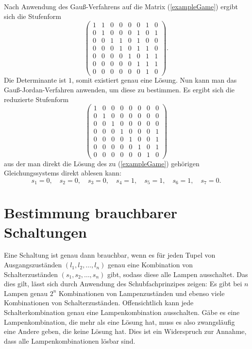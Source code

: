 \documentclass{scrartcl}
\begin{document}
Nach Anwendung des Gauß-Verfahrens auf die Matrix (\ref{exampleGame}) ergibt
sich die Stufenform
\begin{equation}
\left(\begin{array}{ccccccc|c}
  1&1&0&0&0&0&1&0\\
  0&1&0&0&0&1&0&1\\
  0&0&1&1&0&1&0&0\\
  0&0&0&1&0&1&1&0\\
  0&0&0&0&1&0&1&1\\
  0&0&0&0&0&1&1&1\\
  0&0&0&0&0&0&1&0
\end{array}\right).
\end{equation}
Die Determinante ist $1$, somit existiert genau eine Lösung. Nun kann man das
Gauß-Jordan-Verfahren anwenden, um diese zu bestimmen. Es ergibt sich die
reduzierte Stufenform
\begin{equation}
\left(\begin{array}{ccccccc|c}
  1&0&0&0&0&0&0&0\\
  0&1&0&0&0&0&0&0\\
  0&0&1&0&0&0&0&0\\
  0&0&0&1&0&0&0&1\\
  0&0&0&0&1&0&0&1\\
  0&0&0&0&0&1&0&1\\
  0&0&0&0&0&0&1&0
\end{array}\right)
\end{equation}
aus der man direkt die Lösung des zu (\ref{exampleGame}) gehörigen
Gleichungssystems direkt ablesen kann:
\begin{equation}
s_1 = 0,\quad
s_2 = 0,\quad
s_3 = 0,\quad
s_4 = 1,\quad
s_5 = 1,\quad
s_6 = 1,\quad
s_7 = 0.
\end{equation}

\section{Bestimmung brauchbarer Schaltungen}
Eine Schaltung ist genau dann brauchbar, wenn es für jeden Tupel von
Ausgangszuständen $(l_1,l_2,\dots,l_n)$ genau eine Kombination von
Schalterzuständen $(s_1,s_2,\dots,s_n)$ gibt, sodass diese alle Lampen
ausschaltet. Das dies gilt, lässt sich durch Anwendung des Schubfachprinzipes
zeigen: Es gibt bei $n$ Lampen genau $2^n$ Kombinationen von Lampenzuständen und
ebenso viele Kombinationen von Schalterzuständen. Offensichtlich kann jede
Schalterkombination genau eine Lampenkombination ausschalten. Gäbe es eine
Lampenkombination, die mehr als eine Lösung hat, muss es also zwangsläufig eine
Andere geben, die keine Lösung hat. Dies ist ein Widerspruch zur Annahme, dass
alle Lampenkombinationen lösbar sind.
\end{document}
